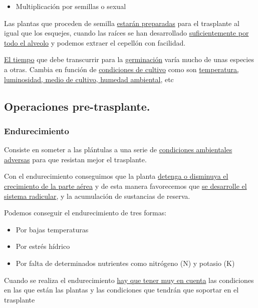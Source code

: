 \documentclass[a4paper,12pt,oneside]{article}
\begin{document}
\begin{itemize}
\item Multiplicación por semillas o sexual\\
\end{itemize}
Las plantas que proceden de semilla \uline{estarán preparadas} para el trasplante al
igual que los esquejes, cuando las raíces se han desarrollado \uline{suficientemente  
por todo el alveolo} y podemos extraer el cepellón con facilidad. 

\uline{El tiempo} que debe transcurrir para la \uline{germinación} varía mucho de unas
especies a otras. Cambia en función de \uline{condiciones de cultivo} como son
\uline{temperatura, luminosidad, medio de cultivo, humedad ambiental}, etc
\subsection{Operaciones pre-trasplante.}
\label{sec:org18423bd}
\subsubsection{Endurecimiento}
\label{sec:org41d404a}
Consiste en someter a las plántulas a una serie de \uline{condiciones ambientales
adversas} para que resistan  mejor el trasplante.

Con el  endurecimiento conseguimos que la planta \uline{detenga o disminuya el
crecimiento de la parte aérea} y de esta manera favorecemos que \uline{se desarrolle
el sistema radicular}, y la acumulación de sustancias de reserva. 

Podemos conseguir el endurecimiento de tres formas:
\begin{itemize}
\item Por bajas temperaturas
\item Por estrés hídrico
\item Por falta de determinados nutrientes como nitrógeno (N) y potasio (K)
\end{itemize}

Cuando se realiza el endurecimiento \uline{hay que tener muy en cuenta} las
condiciones en las que están las plantas y las condiciones que tendrán que
soportar en el trasplante
\end{document}
